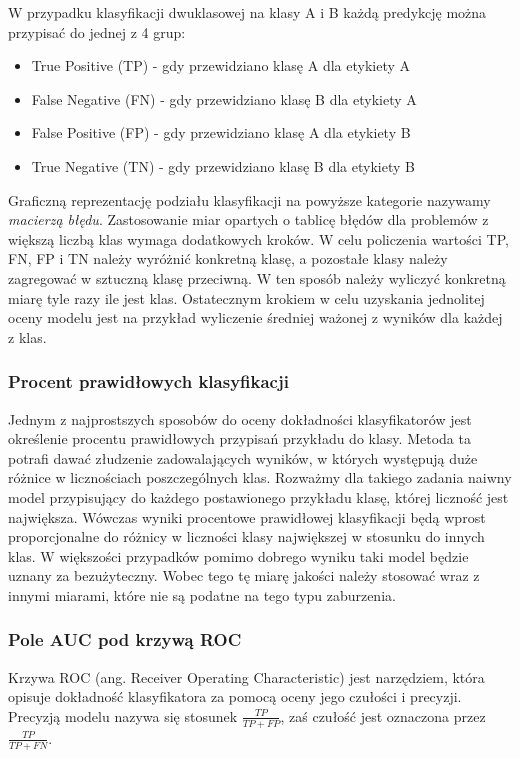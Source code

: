 \documentclass[a4paper, twoside, 11pt, openright]{article}
\begin{document}
W przypadku klasyfikacji dwuklasowej na klasy A i B każdą predykcję można przypisać do jednej z 4 grup:
\begin{itemize}
\item True Positive (TP) - gdy przewidziano klasę A dla etykiety A
\item False Negative (FN) - gdy przewidziano klasę B dla etykiety A
\item False Positive (FP) - gdy przewidziano klasę A dla etykiety B
\item True Negative (TN) - gdy przewidziano klasę B dla etykiety B
\end{itemize}

Graficzną reprezentację podziału klasyfikacji na powyższe kategorie nazywamy \textit{macierzą błędu}. Zastosowanie miar opartych o tablicę błędów dla problemów z większą liczbą klas wymaga dodatkowych kroków. W celu policzenia wartości TP, FN, FP i TN należy wyróżnić konkretną klasę, a pozostałe klasy należy zagregować w sztuczną klasę przeciwną. W ten sposób należy wyliczyć konkretną miarę tyle razy ile jest klas. Ostatecznym krokiem w celu uzyskania jednolitej oceny modelu jest na przykład wyliczenie średniej ważonej z wyników dla każdej z klas.


\subsubsection{Procent prawidłowych klasyfikacji}

Jednym z najprostszych sposobów do oceny dokładności klasyfikatorów jest określenie procentu prawidłowych przypisań przykładu do klasy. Metoda ta potrafi dawać złudzenie zadowalających wyników, w których występują duże różnice w licznościach poszczególnych klas. Rozważmy dla takiego zadania naiwny model przypisujący do każdego postawionego przykładu klasę, której liczność jest największa. Wówczas wyniki procentowe prawidłowej klasyfikacji będą wprost proporcjonalne do różnicy w liczności klasy największej w stosunku do innych klas. W większości przypadków pomimo dobrego wyniku taki model będzie uznany za bezużyteczny. Wobec tego tę miarę jakości należy stosować wraz z innymi miarami, które nie są podatne na tego typu zaburzenia.

\subsubsection{Pole AUC pod krzywą ROC}

Krzywa ROC (ang. Receiver Operating Characteristic)\cite{roc} jest narzędziem, która opisuje dokładność klasyfikatora za pomocą oceny jego czułości i precyzji. Precyzją modelu nazywa się stosunek $\frac{TP}{TP+FP}$, zaś czułość jest oznaczona przez $\frac{TP}{TP+FN}$.
\end{document}
